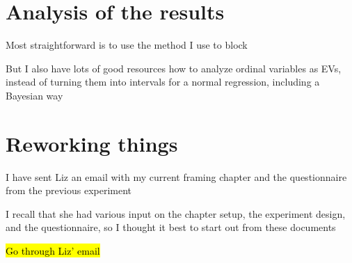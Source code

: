 \section*{Analysis of the results}
	\begin{coi}
		\item Most straightforward is to use the method I use to block
		\item But I also have lots of good resources how to analyze ordinal variables as EVs, instead of turning them into intervals for a normal regression, including a Bayesian way
	\end{coi}



\section*{Reworking things}
	\begin{coi}
		\item I have sent Liz an email with my current framing chapter and the questionnaire from the previous experiment
		\item I recall that she had various input on the chapter setup, the experiment design, and the questionnaire, so I thought it best to start out from these documents
		\item \hl{Go through Liz' email}
	\end{coi}












